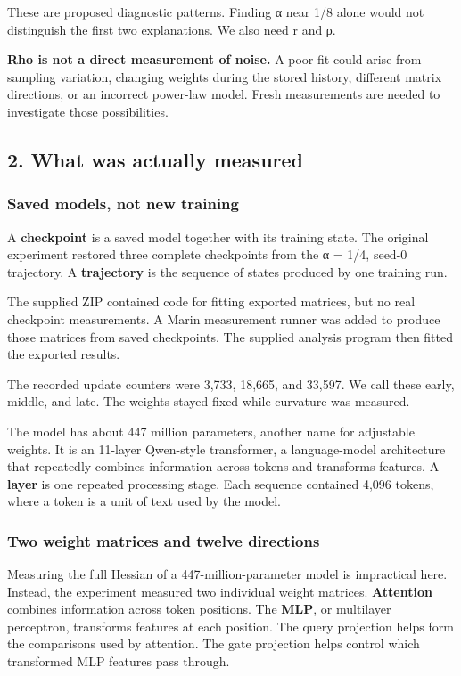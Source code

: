 \documentclass[
  14pt,
  letterpaper,
]{extarticle}
\begin{document}
These are proposed diagnostic patterns. Finding α near 1/8 alone would
not distinguish the first two explanations. We also need r and ρ.

\textbf{Rho is not a direct measurement of noise.} A poor fit could
arise from sampling variation, changing weights during the stored
history, different matrix directions, or an incorrect power-law model.
Fresh measurements are needed to investigate those possibilities.

\subsection{2. What was actually
measured}\label{what-was-actually-measured}

\subsubsection{Saved models, not new
training}\label{saved-models-not-new-training}

A \textbf{checkpoint} is a saved model together with its training state.
The original experiment restored three complete checkpoints from the α =
1/4, seed-0 trajectory. A \textbf{trajectory} is the sequence of states
produced by one training run.

The supplied ZIP contained code for fitting exported matrices, but no
real checkpoint measurements. A Marin measurement runner was added to
produce those matrices from saved checkpoints. The supplied analysis
program then fitted the exported results.

The recorded update counters were 3,733, 18,665, and 33,597. We call
these early, middle, and late. The weights stayed fixed while curvature
was measured.

The model has about 447 million parameters, another name for adjustable
weights. It is an 11-layer Qwen-style transformer, a language-model
architecture that repeatedly combines information across tokens and
transforms features. A \textbf{layer} is one repeated processing stage.
Each sequence contained 4,096 tokens, where a token is a unit of text
used by the model.

\subsubsection{Two weight matrices and twelve
directions}\label{two-weight-matrices-and-twelve-directions}

Measuring the full Hessian of a 447-million-parameter model is
impractical here. Instead, the experiment measured two individual weight
matrices. \textbf{Attention} combines information across token
positions. The \textbf{MLP}, or multilayer perceptron, transforms
features at each position. The query projection helps form the
comparisons used by attention. The gate projection helps control which
transformed MLP features pass through.
\end{document}
